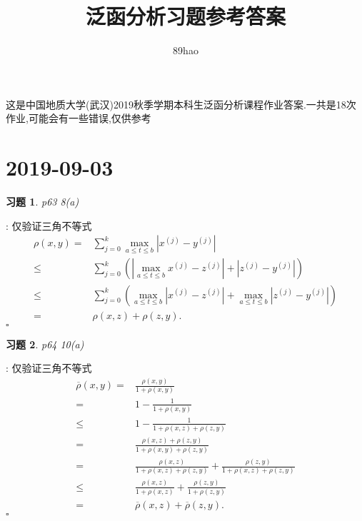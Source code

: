 \documentclass[a4paper]{article}
\newtheorem*{exe}{习题}
\newenvironment{sol}{{\noindent\bfseries 解}:}{\hfill $\square$\par}
\begin{document}
\title{泛函分析习题参考答案}
\author{89hao}
\maketitle
{这是中国地质大学(武汉)2019秋季学期本科生泛函分析课程作业答案.一共是18次作业,可能会有一些错误,仅供参考}
\tableofcontents
\section{2019-09-03}
\begin{exe}
  p63 8(a)
\end{exe}
\begin{sol}
   仅验证三角不等式
  \begin{align*}
    \rho(x,y)=&\sum_{j=0}^{k} \max_{a\le t\le b}\left| x^{(j)}-y^{(j)} \right| \\
    \le & \sum_{j=0}^{k} \left(\left|\max_{a\le t\le b}x^{(j)}-z^{(j)}\right|+\left| z^{(j)}-y^{(j)} \right| \right)\\
    \le & \sum_{j=0}^{k} \left( \max_{a\le t\le b}\left| x^{(j)}-z^{(j)} \right| +\max_{a\le t\le b}\left| z^{(j)}-y^{(j)} \right|  \right) \\
    =& \rho(x,z)+\rho(z,y)
  .\end{align*}
\end{sol}
\begin{exe}
  p64 10(a)
\end{exe}
\begin{sol}
 仅验证三角不等式
\begin{align*}
  \overline{\rho}(x,y)=&\frac{\rho(x,y)}{1+\rho(x,y)}\\
  =&1-\frac{1}{1+\rho(x,y)}\\
  \le &1-\frac{1}{1+\rho(x,z)+\rho(z,y)}\\
  =& \frac{\rho(x,z)+\rho(z,y)}{1+\rho(x,y)+\rho(z,y)}\\
  =&\frac{\rho(x,z)}{1+\rho(x,z)+\rho(z,y)}+\frac{\rho(z,y)}{1+\rho(x,z)+\rho(z,y)}\\
  \le&  \frac{\rho(x,z)}{1+\rho(x,z)}+\frac{\rho(z,y)}{1+\rho(z,y)}\\
  =&\overline{\rho}(x,z)+\overline{\rho}(z,y)
.\end{align*}
\end{sol}
\end{document}
